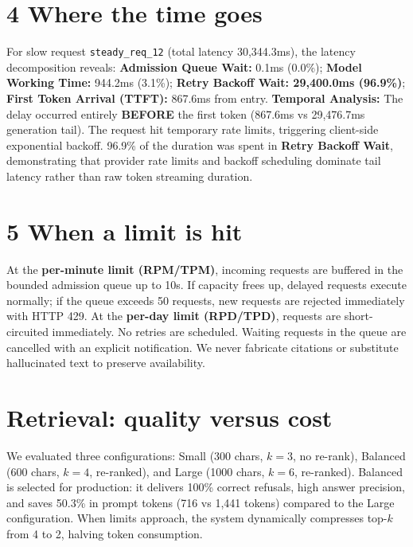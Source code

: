 \documentclass[9pt]{article}
\begin{document}
\section{4 \quad Where the time goes}
For slow request \texttt{steady\_req\_12} (total latency 30,344.3ms), the latency decomposition reveals:
\textbf{Admission Queue Wait:} 0.1ms (0.0\%); \textbf{Model Working Time:} 944.2ms (3.1\%); \textbf{Retry Backoff Wait: 29,400.0ms (96.9\%)}; \textbf{First Token Arrival (TTFT):} 867.6ms from entry.
\textbf{Temporal Analysis:} The delay occurred entirely \textbf{BEFORE} the first token (867.6ms vs 29,476.7ms generation tail). The request hit temporary rate limits, triggering client-side exponential backoff. 96.9\% of the duration was spent in \textbf{Retry Backoff Wait}, demonstrating that provider rate limits and backoff scheduling dominate tail latency rather than raw token streaming duration.

\clearpage

\section{5 \quad When a limit is hit}
At the \textbf{per-minute limit (RPM/TPM)}, incoming requests are buffered in the bounded admission queue up to 10s. If capacity frees up, delayed requests execute normally; if the queue exceeds 50 requests, new requests are rejected immediately with HTTP 429.
At the \textbf{per-day limit (RPD/TPD)}, requests are short-circuited immediately. No retries are scheduled. Waiting requests in the queue are cancelled with an explicit notification. We never fabricate citations or substitute hallucinated text to preserve availability.

\section*{Retrieval: quality versus cost}
We evaluated three configurations: Small (300 chars, $k=3$, no re-rank), Balanced (600 chars, $k=4$, re-ranked), and Large (1000 chars, $k=6$, re-ranked). Balanced is selected for production: it delivers 100\% correct refusals, high answer precision, and saves 50.3\% in prompt tokens (716 vs 1,441 tokens) compared to the Large configuration. When limits approach, the system dynamically compresses top-$k$ from 4 to 2, halving token consumption.
\end{document}
